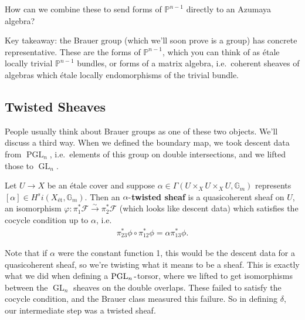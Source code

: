 \begin{question}

How can we combine these to send forms of \({\mathbb{P}}^{n-1}\)
directly to an Azumaya algebra?

\end{question}

\begin{remark}

Key takeaway: the Brauer group (which we'll soon prove is a group) has
concrete representative. These are the forms of \({\mathbb{P}}^{n-1}\),
which you can think of as étale locally trivial \({\mathbb{P}}^{n-1}\)
bundles, or forms of a matrix algebra, i.e.~coherent sheaves of algebras
which étale locally endomorphisms of the trivial bundle.

\end{remark}

\hypertarget{twisted-sheaves}{%
\subsection{Twisted Sheaves}\label{twisted-sheaves}}

People usually think about Brauer groups as one of these two objects.
We'll discuss a third way. When we defined the boundary map, we took
descent data from \(\operatorname{PGL}_n\), i.e.~elements of this group
on double intersections, and we lifted those to
\(\operatorname{GL}_{n}\).

\begin{definition}

Let \(U \to X\) be an étale cover and suppose
\(\alpha \in \Gamma(U \times_{X} U \times_{X} U, {\mathbb{G}}_{m})\)
represents \([\alpha] \in H^{s}i(X_{\text{ét}}, {\mathbb{G}}_{m})\).
Then an \textbf{\(\alpha{\hbox{-}}\)twisted sheaf} is a quasicoherent
sheaf on \(U\), an isomorphism
\(\varphi:\pi_{1}^{*} \mathcal{F} \xrightarrow{\sim}\pi_{2}^{*} \mathcal{F}\)
(which looks like descent data) which satisfies the cocycle condition up
to \(\alpha\), i.e.~
\begin{align*}  
\pi_{23}^{*} \phi \circ \pi_{12}^{*}\phi = \alpha \pi_{13}^{*}\phi
.\end{align*}

\end{definition}

\begin{remark}

Note that if \(\alpha\) were the constant function 1, this would be the
descent data for a quasicoherent sheaf, so we're twisting what it means
to be a sheaf. This is exactly what we did when defining a
\(\operatorname{PGL}_{n}{\hbox{-}}\)torsor, where we lifted to get
isomorphisms between the \(\operatorname{GL}_{n}\) sheaves on the double
overlaps. These failed to satisfy the cocycle condition, and the Brauer
class measured this failure. So in defining \(\delta\), our intermediate
step was a twisted sheaf.

\end{remark}

